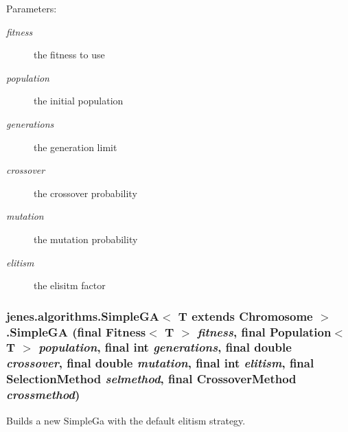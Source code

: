 \begin{Desc}
\item[Parameters:]
\begin{description}
\item[{\em fitness}]the fitness to use \item[{\em population}]the initial population \item[{\em generations}]the generation limit \item[{\em crossover}]the crossover probability \item[{\em mutation}]the mutation probability \item[{\em elitism}]the elisitm factor \end{description}
\end{Desc}
\hypertarget{classjenes_1_1algorithms_1_1_simple_g_a_3_01_t_01extends_01_chromosome_01_4_eb160f73fc3a8937c7d8da9140f57e38}{
\subsubsection[SimpleGA]{\setlength{\rightskip}{0pt plus 5cm}jenes.algorithms.SimpleGA$<$ T extends Chromosome $>$.SimpleGA (final Fitness$<$ T $>$ {\em fitness}, \/  final Population$<$ T $>$ {\em population}, \/  final int {\em generations}, \/  final double {\em crossover}, \/  final double {\em mutation}, \/  final int {\em elitism}, \/  final {\bf SelectionMethod} {\em selmethod}, \/  final {\bf CrossoverMethod} {\em crossmethod})}}
\label{classjenes_1_1algorithms_1_1_simple_g_a_3_01_t_01extends_01_chromosome_01_4_eb160f73fc3a8937c7d8da9140f57e38}


Builds a new SimpleGa with the default elitism strategy.

